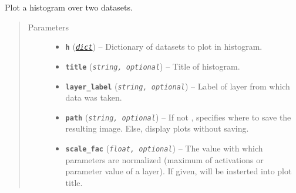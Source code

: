 \documentclass[letterpaper,10pt,english]{sphinxmanual}
\begin{document}

\begin{fulllineitems}
\label{snntoolbox.io_utils:snntoolbox.io_utils.plotting.plot_error_vs_time}
\end{fulllineitems}


\begin{fulllineitems}
\label{snntoolbox.io_utils:snntoolbox.io_utils.plotting.plot_hist}
Plot a histogram over two datasets.
\begin{quote}\begin{description}
\item[{Parameters}] \leavevmode\begin{itemize}
\item {} 
\textbf{\texttt{h}} (\href{https://docs.python.org/library/stdtypes.html\#dict}{\emph{\texttt{dict}}}) -- Dictionary of datasets to plot in histogram.

\item {} 
\textbf{\texttt{title}} (\emph{\texttt{string, optional}}) -- Title of histogram.

\item {} 
\textbf{\texttt{layer\_label}} (\emph{\texttt{string, optional}}) -- Label of layer from which data was taken.

\item {} 
\textbf{\texttt{path}} (\emph{\texttt{string, optional}}) -- If not , specifies where to save the resulting image. Else,
display plots without saving.

\item {} 
\textbf{\texttt{scale\_fac}} (\emph{\texttt{float, optional}}) -- The value with which parameters are normalized (maximum of activations
or parameter value of a layer). If given, will be insterted into plot
title.

\end{itemize}

\end{description}\end{quote}

\end{fulllineitems}
\end{document}
